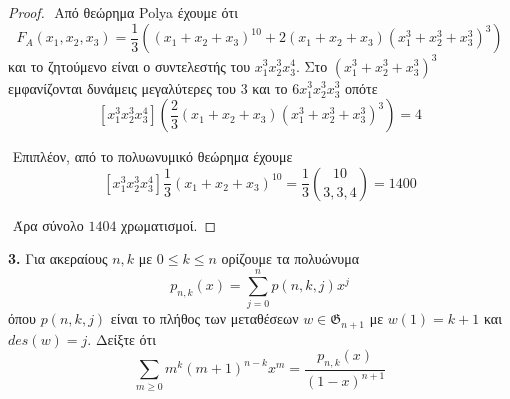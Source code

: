 \documentclass[oneside,a4paper]{article}
\newcommand {\tl}{\textlatin}
\begin{document}
\begin{proof}
	$ $\newline
	Από θεώρημα \tl{Polya} έχουμε ότι $$F_A(x_1,x_2,x_3) = \frac13\left(\left(x_1 + x_2 + x_3\right)^{10} + 2\left(x_1 + x_2 + x_3\right)\left(x^3_1 + x^3_2 + x^3_3\right)^3\right)$$ και το ζητούμενο είναι ο συντελεστής του $x^3_1 x^3_2 x^4_3$. Στο $\left(x^3_1 + x^3_2 + x^3_3\right)^3$ εμφανίζονται δυνάμεις μεγαλύτερες του $3$ και το $6 x^3_1 x^3_2 x^3_3$ οπότε $$[x^3_1 x^3_2 x^4_3]\left(\frac23 (x_1 + x_2 + x_3)(x^3_1 + x^3_2 + x^3_3)^3 \right)= 4$$

	$ $\newline
	Επιπλέον, από το πολυωνυμικό θεώρημα έχουμε $$[x^3_1 x^3_2 x^4_3] \frac13 \left(x_1 + x_2 + x_3\right)^{10}=  \frac13 \binom{10}{3,3,4} = 1400$$

	$ $\newline
	Άρα σύνολο $1404$ χρωματισμοί.
\end{proof}
\pagebreak

\noindent \textbf{3. } Για ακεραίους $n,k$ με $0\leq k \leq n$ ορίζουμε τα πολυώνυμα $$p_{n,k}(x) = \sum\limits_{j=0}^n p(n,k,j)x^j$$ όπου $p(n,k,j)$ είναι το πλήθος των μεταθέσεων $w \in \mathfrak{G}_{n+1}$ με $w(1) = k+1$ και $des(w) = j$. Δείξτε ότι $$\sum\limits_{m\geq 0} m^k (m+1)^{n-k}x^m = \frac{p_{n,k}(x)}{(1-x)^{n+1}}$$
\end{document}
